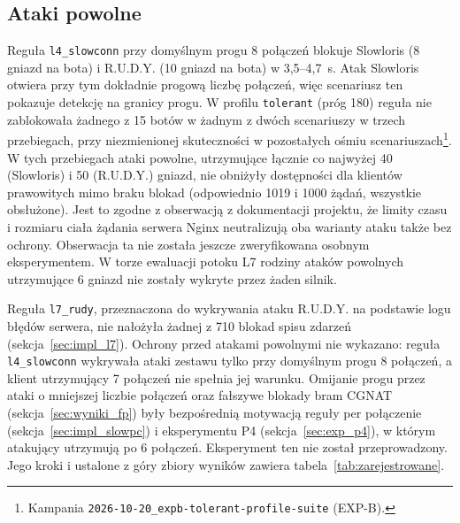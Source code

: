 \documentclass[a4paper,12pt]{article}
\begin{document}
\subsection{Ataki powolne}\label{sec:wyniki_slow}
Reguła \texttt{l4\_slowconn} przy domyślnym progu 8 połączeń blokuje Slowloris (8 gniazd na bota) i R.U.D.Y. (10 gniazd na bota) w 3,5--4,7~s. Atak Slowloris otwiera przy tym dokładnie progową liczbę połączeń, więc scenariusz ten pokazuje detekcję na granicy progu. W profilu \texttt{tolerant} (próg 180) reguła nie zablokowała żadnego z 15 botów w żadnym z dwóch scenariuszy w trzech przebiegach, przy niezmienionej skuteczności w pozostałych ośmiu scenariuszach\footnote{\raggedright Kampania \texttt{2026-10-20\_expb-tolerant-profile-suite} (EXP-B).}. W tych przebiegach ataki powolne, utrzymujące łącznie co najwyżej 40 (Slowloris) i 50 (R.U.D.Y.) gniazd, nie obniżyły dostępności dla klientów prawowitych mimo braku blokad (odpowiednio 1019 i 1000 żądań, wszystkie obsłużone). Jest to zgodne z obserwacją z dokumentacji projektu, że limity czasu i rozmiaru ciała żądania serwera Nginx neutralizują oba warianty ataku także bez ochrony. Obserwacja ta nie została jeszcze zweryfikowana osobnym eksperymentem. W torze ewaluacji potoku L7 rodziny ataków powolnych utrzymujące 6 gniazd nie zostały wykryte przez żaden silnik.

Reguła \texttt{l7\_rudy}, przeznaczona do wykrywania ataku R.U.D.Y. na podstawie logu błędów serwera, nie nałożyła żadnej z 710 blokad spisu zdarzeń (sekcja~\ref{sec:impl_l7}). Ochrony przed atakami powolnymi nie wykazano: reguła \texttt{l4\_slowconn} wykrywała ataki zestawu tylko przy domyślnym progu 8 połączeń, a klient utrzymujący 7 połączeń nie spełnia jej warunku. Omijanie progu przez ataki o mniejszej liczbie połączeń oraz fałszywe blokady bram CGNAT (sekcja~\ref{sec:wyniki_fp}) były bezpośrednią motywacją reguły per połączenie (sekcja~\ref{sec:impl_slowpc}) i eksperymentu P4 (sekcja~\ref{sec:exp_p4}), w którym atakujący utrzymują po 6 połączeń. Eksperyment ten nie został przeprowadzony. Jego kroki i ustalone z góry zbiory wyników zawiera tabela~\ref{tab:zarejestrowane}.
\end{document}
